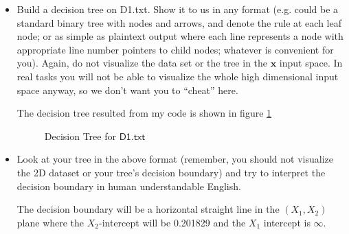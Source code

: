 \documentclass[a4paper]{article}
\theoremstyle{definition}
\def\x{\mathbf x}
\newenvironment{soln}{
    \leavevmode\color{blue}\ignorespaces
}{}
\begin{document}
\begin{enumerate}
\begin{itemize}
  \item Build a decision tree on D1.txt.  Show it to us in any format (e.g. could be a standard binary tree with nodes and arrows, and denote the rule at each leaf node; or as simple as plaintext output where each line represents a node with appropriate line number pointers to child nodes; whatever is convenient for you). Again, do not visualize the data set or the tree in the $\x$ input space.  In real tasks you will not be able to visualize the whole high dimensional input space anyway, so we don't want you to ``cheat'' here. 

  \begin{soln}
      The decision tree resulted from my code is shown in figure \ref{fig:3}

      \begin{figure}[h]
          \centering
          \caption{Decision Tree for $\mathsf{D1.txt}$}
          \label{fig:3}
      \end{figure}
  \end{soln}
  
  \item Look at your tree in the above format (remember, you should not visualize the 2D dataset or your tree's decision boundary) and try to interpret the decision boundary in human understandable English.
  \begin{soln}
      The decision boundary will be a horizontal straight line in the $(X_1, X_2)$ plane where the $X_2$-intercept will be 0.201829 and the $X_1$ intercept is $\infty$.
  \end{soln}
  

\end{itemize}
\end{enumerate}
\end{document}
